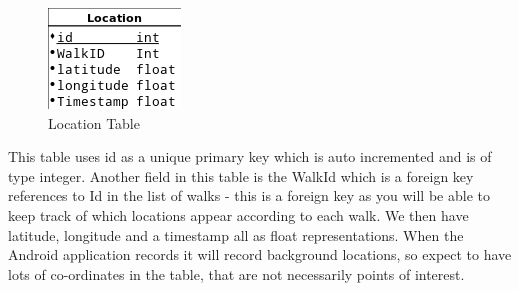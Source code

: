 \documentclass[12pt]{article}
\begin{document}
	\begin{figure}[htp]
\centering
\includegraphics[scale=0.70]{Final_report/Location.png}
\caption{Location Table}
\label{Location Table}
\end{figure}
This table uses id as a unique primary key which is auto incremented and is of type integer. Another field in this table is the WalkId which is a foreign key references to Id in the list of walks - this is a foreign key as you will be able to keep track of which locations appear according to each walk. We then have latitude, longitude and a timestamp all as float representations. When the Android application records it will record background locations, so expect to have lots of co-ordinates in the table, that are not necessarily points of interest.

	~\\
	
\end{document}

